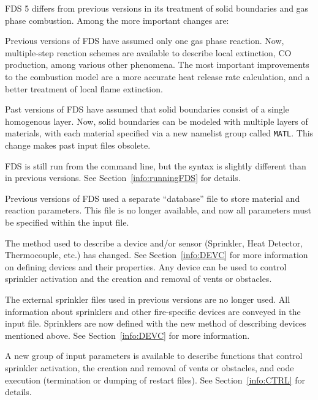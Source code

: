 \documentclass[11pt]{book}
\newcommand{\ct}{\tt\small}
\begin{document}
FDS 5 differs from previous versions in its treatment of solid boundaries and
gas phase combustion. Among the more important changes are:
\begin{description}
\item[{\bf Multi-Step Combustion}] Previous versions of FDS have assumed only one gas
phase reaction. Now, multiple-step reaction schemes are available to describe local
extinction, CO production, among various other phenomena. The most important improvements to the combustion model are a more
accurate heat release rate calculation, and a better treatment of local flame extinction.

\item[{\bf Material Layers}] Past versions of FDS have assumed that solid boundaries
consist of a single homogenous layer. Now, solid boundaries can be modeled with
multiple layers of materials, with each material specified via a new namelist
group called {\ct MATL}. This change makes past input files obsolete.

\item[{\bf Command Line Format}] FDS is still run from the command line, but the syntax
is slightly different than in previous versions. See Section~\ref{info:runningFDS} for
details.

\item[{\bf Database}] Previous versions of FDS used a separate ``database'' file to store
material and reaction parameters. This file is no longer available, and now all
parameters must be specified within the input file.

\item[{\bf Device Descriptions}] The method used to describe a device and/or sensor
(Sprinkler, Heat Detector, Thermocouple, etc.) has changed.  See Section~\ref{info:DEVC}
for more information on defining devices and their properties.  Any device can be used to control
sprinkler activation and the creation and removal of vents or obstacles.

\item[{\bf Sprinklers}] The external sprinkler files used in previous versions
are no longer used. All information about sprinklers and other fire-specific devices are
conveyed in the input file.  Sprinklers are now defined with the new method of describing
devices mentioned above.  See Section~\ref{info:DEVC} for more information.

\item[{\bf Control Functions}] A new group of input parameters is available to describe functions
that control sprinkler activation, the creation and removal of vents or obstacles,
and code execution (termination or dumping of restart files). See Section~\ref{info:CTRL} for details.


\end{description}
\end{document}
